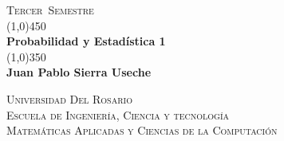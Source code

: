 \documentclass[a4paper]{book}
\newcommand{\titPag}{
    \begin{titlepage}
        \begin{flushright}
            \textsc{\large {\semestre\ Semestre}}\\
            \line(1,0){450} \\
            [0.635cm]
            \huge{\bfseries \asignatura} \\
            [0.2cm]
            \line(1,0){350} \\
            \LARGE{\bfseries \autor} \\
            [16.25cm]
        \end{flushright}
        \begin{flushright}
        \textsc{
            \universidad \\
            [0.1cm]
            \escuela \\
            [0.1cm]
            \carrera
        }
        \end{flushright}
    \end{titlepage}
}
\newcommand{\asignatura}{Probabilidad y Estadística 1}
\newcommand{\autor}{Juan Pablo Sierra Useche}
\newcommand{\semestre}{Tercer}
\newcommand{\universidad}{Universidad Del Rosario}
\newcommand{\escuela}{Escuela de Ingeniería, Ciencia y tecnología}
\newcommand{\carrera}{Matemáticas Aplicadas y Ciencias de la Computación}
\begin{document}
    \titPag
    \tableofcontents







    \printbibliography
\end{document}
